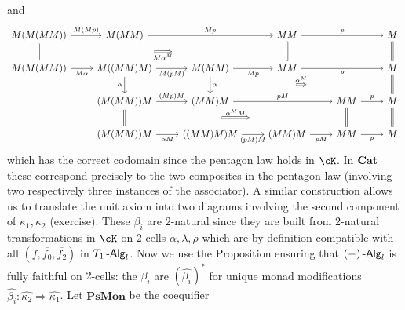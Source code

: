 \documentclass[a4paper,11pt,oneside,openany]{scrbook}
\begin{document}
and 
\[\begin{tikzcd}
	{M(M(MM))} & {M(MM)} && MM && M \\
	{M(M(MM))} & {M((MM)M)} & {M(MM)} & MM && M \\
	& {(M(MM))M} & {(MM)M} && MM & M \\
	& {(M(MM))M} & {((MM)M)M} & {(MM)M} & MM & M
	\arrow["{M(Mp)}", from=1-1, to=1-2]
	\arrow[""{name=0, anchor=center, inner sep=0}, Rightarrow, no head, from=1-1, to=2-1]
	\arrow["M\alpha"', from=2-1, to=2-2]
	\arrow["{M(pM)}"', from=2-2, to=2-3]
	\arrow["Mp"', from=2-3, to=2-4]
	\arrow["Mp", from=1-2, to=1-4]
	\arrow["p", from=1-4, to=1-6]
	\arrow["p"', from=2-4, to=2-6]
	\arrow[Rightarrow, no head, from=1-6, to=2-6]
	\arrow["\alpha"', from=2-2, to=3-2]
	\arrow[""{name=1, anchor=center, inner sep=0}, Rightarrow, no head, from=3-2, to=4-2]
	\arrow["{(Mp)M}", from=3-2, to=3-3]
	\arrow[""{name=2, anchor=center, inner sep=0}, "\alpha", from=2-3, to=3-3]
	\arrow["pM", from=3-3, to=3-5]
	\arrow["p", from=3-5, to=3-6]
	\arrow[""{name=3, anchor=center, inner sep=0}, Rightarrow, no head, from=2-6, to=3-6]
	\arrow["{\alpha M}"', from=4-2, to=4-3]
	\arrow["p"', from=4-5, to=4-6]
	\arrow[Rightarrow, no head, from=3-6, to=4-6]
	\arrow[""{name=4, anchor=center, inner sep=0}, Rightarrow, no head, from=3-5, to=4-5]
	\arrow["{(pM)M}"', from=4-3, to=4-4]
	\arrow["pM"', from=4-4, to=4-5]
	\arrow[""{name=5, anchor=center, inner sep=0}, Rightarrow, no head, from=1-4, to=2-4]
	\arrow["{M\alpha^M}"', shorten <=122pt, shorten >=122pt, Rightarrow, from=0, to=5]
	\arrow["{\alpha^MM}", shorten <=103pt, shorten >=103pt, Rightarrow, from=1, to=4]
	\arrow["{\alpha^M}", shorten <=91pt, shorten >=91pt, Rightarrow, from=2, to=3]
\end{tikzcd}\]
which has the correct codomain since the pentagon law holds in $\cK$. In ${\normalfont\textbf{Cat}}$ these correspond precisely to the two composites in the pentagon law (involving two respectively three instances of the associator). A similar construction allows us to translate the unit axiom into two diagrams involving the second component of $\kappa_1,\kappa_2$ (exercise). These $\beta_i$ are $2$-natural since they are built from $2$-natural transformations in $\cK$ on $2$-cells $\alpha, \lambda, \rho$ which are by definition compatible with all $(f,\overline{f_0},\overline{f_2})$ in $T_1\operatorname{-\mathsf{Alg}}_l$. Now we use the Proposition ensuring that $(-)\operatorname{-\mathsf{Alg}}_l$ is fully faithful on $2$-cells: the $\beta_i$ are $(\hat{\beta_i})^*$ for unique monad modifications $\widehat{\beta_i}\colon\widehat{\kappa_2}\Rightarrow\widehat{\kappa_1}$. Let $\mathbf{PsMon}$ be the coequifier 
\end{document}
